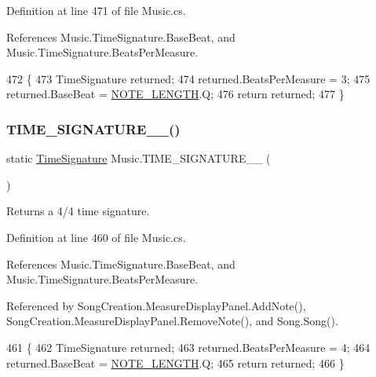 Definition at line 471 of file Music.\+cs.



References Music.\+Time\+Signature.\+Base\+Beat, and Music.\+Time\+Signature.\+Beats\+Per\+Measure.


\begin{DoxyCode}
472     \{
473         TimeSignature returned;
474         returned.BeatsPerMeasure = 3;
475         returned.BaseBeat = \hyperlink{group___music_enums_gaf11b5f079adbb21c800b9eca1c5c3cbd}{NOTE\_LENGTH}.Q;
476         \textcolor{keywordflow}{return} returned;
477     \}
\end{DoxyCode}
\mbox{\label{group___music_static_func_gac95af323eef7511543c799154e1c29fd}} 
\subsubsection{\texorpdfstring{T\+I\+M\+E\+\_\+\+S\+I\+G\+N\+A\+T\+U\+R\+E\+\_\+\_()}{TIME\_SIGNATURE\_4\_4()}}
{\footnotesize\ttfamily static \hyperlink{group___music_structs_struct_music_1_1_time_signature}{Time\+Signature} Music.\+T\+I\+M\+E\+\_\+\+S\+I\+G\+N\+A\+T\+U\+R\+E\+\_\+\_ (\begin{DoxyParamCaption}{ }\end{DoxyParamCaption})\hspace{0.3cm}{\ttfamily [static]}}



Returns a 4/4 time signature. 



Definition at line 460 of file Music.\+cs.



References Music.\+Time\+Signature.\+Base\+Beat, and Music.\+Time\+Signature.\+Beats\+Per\+Measure.



Referenced by Song\+Creation.\+Measure\+Display\+Panel.\+Add\+Note(), Song\+Creation.\+Measure\+Display\+Panel.\+Remove\+Note(), and Song.\+Song().


\begin{DoxyCode}
461     \{
462         TimeSignature returned;
463         returned.BeatsPerMeasure = 4;
464         returned.BaseBeat = \hyperlink{group___music_enums_gaf11b5f079adbb21c800b9eca1c5c3cbd}{NOTE\_LENGTH}.Q;
465         \textcolor{keywordflow}{return} returned;
466     \}
\end{DoxyCode}
\mbox{\label{group___music_static_func_gabfda54cf40e32a4299de5a2fde753347}} 
